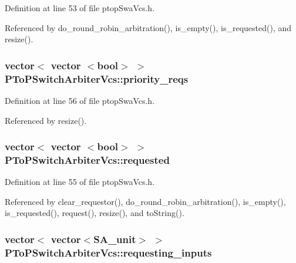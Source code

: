 Definition at line 53 of file ptopSwaVcs.h.

Referenced by do\_\-round\_\-robin\_\-arbitration(), is\_\-empty(), is\_\-requested(), and resize().
\subsubsection[{priority\_\-reqs}]{\setlength{\rightskip}{0pt plus 5cm}vector$<$ vector $<$bool$>$ $>$ {\bf PToPSwitchArbiterVcs::priority\_\-reqs}\hspace{0.3cm}{\tt  [private]}}\label{classPToPSwitchArbiterVcs_ce903c8ba11cf00d738dc14c7af152c2}




Definition at line 56 of file ptopSwaVcs.h.

Referenced by resize().
\subsubsection[{requested}]{\setlength{\rightskip}{0pt plus 5cm}vector$<$ vector $<$bool$>$ $>$ {\bf PToPSwitchArbiterVcs::requested}\hspace{0.3cm}{\tt  [private]}}\label{classPToPSwitchArbiterVcs_3b8835d4168422f28451087b513dc1d8}




Definition at line 55 of file ptopSwaVcs.h.

Referenced by clear\_\-requestor(), do\_\-round\_\-robin\_\-arbitration(), is\_\-empty(), is\_\-requested(), request(), resize(), and toString().
\subsubsection[{requesting\_\-inputs}]{\setlength{\rightskip}{0pt plus 5cm}vector$<$ vector$<${\bf SA\_\-unit}$>$ $>$ {\bf PToPSwitchArbiterVcs::requesting\_\-inputs}\hspace{0.3cm}{\tt  [private]}}\label{classPToPSwitchArbiterVcs_454d0d84471682e1563ae6b1b4c4da5d}





